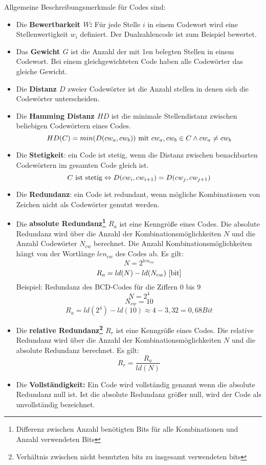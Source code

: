 Allgemeine Beschreibungsmerkmale für Codes sind:
\begin{itemize}
\item
	Die \textbf{Bewertbarkeit $W$:} Für jede Stelle $i$ in einem Codewort wird eine  Stellenwertigkeit $w_i$ definiert. Der Dualzahlencode ist zum Beispiel bewertet.
\item
	Das \textbf{Gewicht $G$} ist die Anzahl der mit 1en belegten Stellen in einem Codewort. Bei einem gleichgewichteten Code haben alle Codewörter das gleiche Gewicht.
\item
	Die \textbf{Distanz $D$} zweier Codewörter ist die Anzahl stellen in denen sich die Codewörter unterscheiden.
\item
	Die \textbf{Hamming Distanz $HD$} ist die minimale Stellendistanz zwischen beliebigen Codewörtern eines Codes.
	$$HD(C) = min(D(cw_a, cw_b)) \textnormal{ mit } cw_a, cw_b \in C 
		\wedge cw_a \ne cw_b $$
\item
	Die \textbf{Stetigkeit}: ein Code ist stetig, wenn die Distanz zwischen benachbarten Codewörtern im gesamten Code gleich ist.
	$$ C \textnormal{ ist stetig} \Leftrightarrow D(cw_i, cw_{i+1}) = D(cw_j, cw_{j+1}) $$
\item
	Die \textbf{Redundanz}: ein Code ist redundant, wenn mögliche Kombinationen von Zeichen nicht als Codewörter genutzt werden.
\item
	Die \textbf{absolute Redundanz\footnote{Differenz zwischen Anzahl benötigten Bits für alle Kombinationen und Anzahl verwendeten Bits} $R_a$} ist eine Kenngröße eines Codes. Die absolute Redundanz wird über die Anzahl der Kombinationsmöglichkeiten $N$ und die Anzahl Codewörter $N_{cw}$ berechnet. Die Anzahl Kombinationsmöglichkeiten hängt von der Wortlänge $len_{cw}$ des Codes ab. Es gilt:
	$$ N = 2^{len_{cw}} $$
	$$ R_a = ld(N) - ld(N_{cw}) \textnormal{ [bit]} $$
	Beispiel: Redundanz des BCD-Codes für die Ziffern 0 bis 9
	$$ N = 2^4 $$
	$$ N_{cw} = 10 $$
	$$ R_a = ld(2^4) - ld(10) \approx 4 - 3,32 = 0,68 Bit $$
\item
	Die \textbf{relative Redundanz\footnote{Verhältnis zwischen nicht benutzten bits zu insgesamt verwendeten bits} $R_r$} ist eine Kenngröße eines Codes. Die relative Redundanz wird über die Anzahl der Kombinationsmöglichkeiten $N$ und die absolute Redundanz berechnet. Es gilt:
	$$ R_r = \frac{R_a}{ld(N)} $$
\item
	Die \textbf{Vollständigkeit:} Ein Code wird vollständig genannt wenn die absolute Redundanz null ist. Ist die absolute Redundanz größer null, wird der Code als unvollständig bezeichnet.

\end{itemize}

